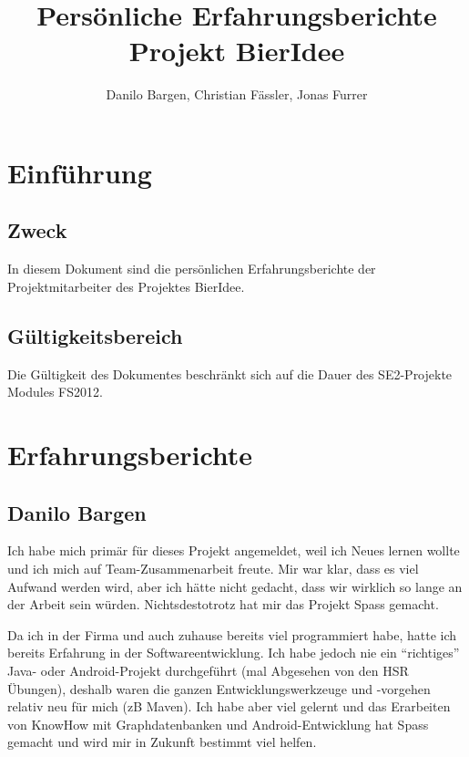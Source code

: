 \documentclass[10pt,a4paper]{scrartcl}
\author{Danilo Bargen, Christian Fässler, Jonas Furrer}
\title{Persönliche Erfahrungsberichte\\ Projekt BierIdee}
\begin{document}
\begin{titlepage}
	\maketitle
	\vspace{120mm}
	\thispagestyle{empty} %
\end{titlepage}

\tableofcontents
\newpage

\section{Einführung}

\subsection{Zweck}
In diesem Dokument sind die persönlichen Erfahrungsberichte der Projektmitarbeiter des Projektes BierIdee.

\subsection{Gültigkeitsbereich}
Die Gültigkeit des Dokumentes beschränkt sich auf die Dauer des SE2-Projekte Modules FS2012.

\newpage
\section{Erfahrungsberichte}
\subsection{Danilo Bargen}

Ich habe mich primär für dieses Projekt angemeldet, weil ich Neues lernen wollte und ich mich auf
Team-Zusammenarbeit freute. Mir war klar, dass es viel Aufwand werden wird, aber ich hätte nicht
gedacht, dass wir wirklich so lange an der Arbeit sein würden. Nichtsdestotrotz hat mir das Projekt
Spass gemacht.

Da ich in der Firma und auch zuhause bereits viel programmiert habe, hatte ich bereits Erfahrung in
der Softwareentwicklung. Ich habe jedoch nie ein "`richtiges"' Java- oder Android-Projekt
durchgeführt (mal Abgesehen von den HSR Übungen), deshalb waren die ganzen Entwicklungswerkzeuge und
-vorgehen relativ neu für mich (zB Maven). Ich habe aber viel gelernt und das Erarbeiten von KnowHow
mit Graphdatenbanken und Android-Entwicklung hat Spass gemacht und wird mir in Zukunft bestimmt viel
helfen.
\end{document}
